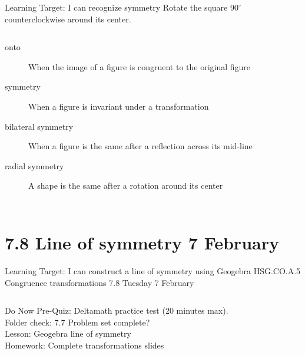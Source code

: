 \documentclass[onlytextwidth, aspectratio=169]{beamer}
\begin{document}
\begin{frame}{Learning Target: I can recognize symmetry}
  Rotate the square $90^\circ$ counterclockwise around its center. \vspace{0.25cm}
  \begin{columns}
\begin{description}
  \item[onto] When the image of a figure is congruent to the original figure
  \item[symmetry] When a figure is invariant under a transformation
  \item[bilateral symmetry] When a figure is the same after a reflection across its mid-line
  \item[radial symmetry] A shape is the same after a rotation around its center
\end{description}
    \begin{flushright}
    \end{flushright}
  \end{columns}
\end{frame}

\section{7.8 Line of symmetry \hfill 7 February \,}
\begin{frame}{Learning Target: I can construct a line of symmetry using Geogebra}
  {HSG.CO.A.5 Congruence transformations \hfill \alert{7.8 Tuesday 7 February}}
  \begin{columns}
    Do Now Pre-Quiz: Deltamath practice test (20 minutes max). \\[0.3cm]
    Folder check: 7.7 Problem set complete? \\[0.3cm]
    Lesson: Geogebra line of symmetry \\[0.3cm]
    Homework: Complete transformations slides
    \begin{center}
    \end{center}
  \end{columns}
\end{frame}
\end{document}
